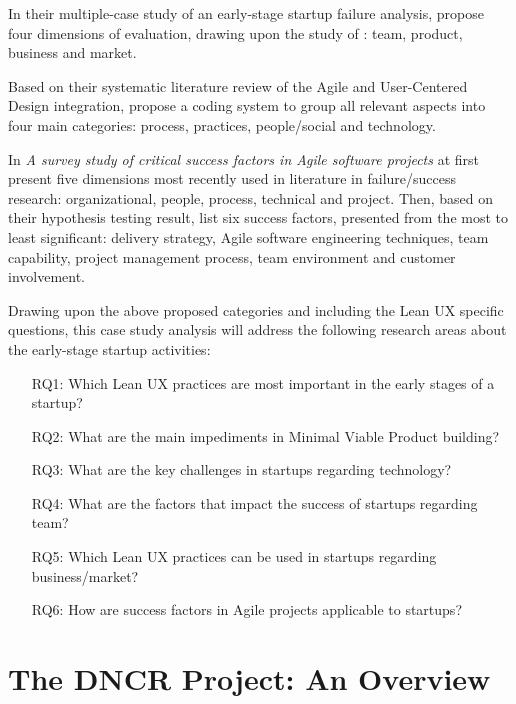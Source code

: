 \documentclass{article}
\begin{document}
In their multiple-case study of an early-stage startup failure analysis, \cite{giardino2014early} propose four dimensions of evaluation, drawing upon the study of \cite{macmillan1987criteria}: team, product, business and market.

Based on their systematic literature review of the Agile and User-Centered Design integration,  \cite{brhel2015exploring} propose a coding system to group all relevant aspects into four main categories: process, practices, people/social and technology.

In \textit{A survey study of critical success factors in Agile software projects} \cite{cao2008agile} at first present five dimensions most recently used in literature in failure/success research: organizational, people, process, technical and project. Then, based on their hypothesis testing result, \citeauthor{cao2008agile} list six success factors, presented from the most to least significant: delivery strategy, Agile software engineering techniques, team capability, project management process, team environment and customer involvement.

Drawing upon the above proposed categories and including the Lean UX specific questions, this case study analysis will address the following research areas about the early-stage startup activities:

\begin{itemize}
\item[RQ1:] Which Lean UX practices are most important in the early stages of a startup?
\item[RQ2:] What are the main impediments in Minimal Viable Product building?
\item[RQ3:] What are the key challenges in startups regarding technology?
\item[RQ4:] What are the factors that impact the success of startups regarding team?
\item[RQ5:] Which Lean UX practices can be used in startups regarding business/market?
\item[RQ6:] How are success factors in Agile projects \citep{cao2008agile} applicable to startups?

\end{itemize}

\section{The DNCR Project: An Overview}
\label{sec:dncr-project}
\end{document}
